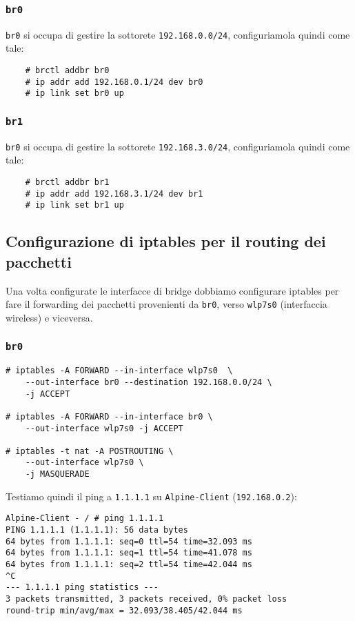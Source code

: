 \documentclass{article}
\newcommand{\interface}[1]{{\lstinline[basicstyle=\ttfamily\color{brown}]|#1|}}
\newcommand{\ipaddress}[1]{{\lstinline[basicstyle=\ttfamily\color{purple}]|#1|}}
\newcommand{\hostname}[1]{{\lstinline[basicstyle=\ttfamily\color{teal}]|#1|}}
\begin{document}
\subsubsection{\interface{br0}}
\interface{br0} si occupa di gestire la sottorete \ipaddress{192.168.0.0/24},
configuriamola quindi come tale:
\begin{lstlisting}
    # brctl addbr br0
    # ip addr add 192.168.0.1/24 dev br0
    # ip link set br0 up
\end{lstlisting}

\subsubsection{\interface{br1}}
\interface{br0} si occupa di gestire la sottorete \ipaddress{192.168.3.0/24},
configuriamola quindi come tale:
\begin{lstlisting}
    # brctl addbr br1
    # ip addr add 192.168.3.1/24 dev br1
    # ip link set br1 up
\end{lstlisting}

\subsection{Configurazione di iptables per il routing dei pacchetti}
Una volta configurate le interfacce di bridge dobbiamo configurare iptables per 
fare il forwarding dei pacchetti provenienti da \interface{br0}, verso \interface{wlp7s0} (interfaccia wireless)
e viceversa.

\subsubsection{\interface{br0}}
\begin{lstlisting}
# iptables -A FORWARD --in-interface wlp7s0  \
    --out-interface br0 --destination 192.168.0.0/24 \
    -j ACCEPT

# iptables -A FORWARD --in-interface br0 \
    --out-interface wlp7s0 -j ACCEPT

# iptables -t nat -A POSTROUTING \ 
    --out-interface wlp7s0 \
    -j MASQUERADE
\end{lstlisting}
\vspace{1em}
Testiamo quindi il ping a \ipaddress{1.1.1.1} su \hostname{Alpine-Client} (\ipaddress{192.168.0.2}):
\begin{lstlisting}
Alpine-Client - / # ping 1.1.1.1
PING 1.1.1.1 (1.1.1.1): 56 data bytes
64 bytes from 1.1.1.1: seq=0 ttl=54 time=32.093 ms
64 bytes from 1.1.1.1: seq=1 ttl=54 time=41.078 ms
64 bytes from 1.1.1.1: seq=2 ttl=54 time=42.044 ms
^C
--- 1.1.1.1 ping statistics ---
3 packets transmitted, 3 packets received, 0% packet loss
round-trip min/avg/max = 32.093/38.405/42.044 ms
\end{lstlisting}
\vspace{1em}
\end{document}

